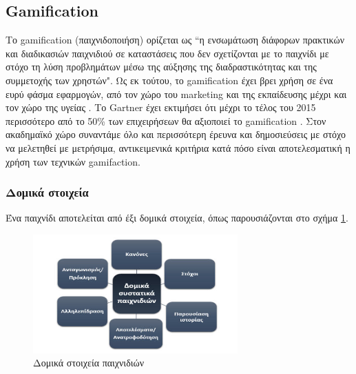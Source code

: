 	\subsection{Gamification}
		Το gamification (παιχνιδοποιήση) ορίζεται ως ``η ενσωμάτωση διάφορων πρακτικών και διαδικασιών παιχνιδιού σε καταστάσεις που δεν σχετίζονται με το παιχνίδι με στόχο τη λύση προβλημάτων μέσω της αύξησης της διαδραστικότητας και της συμμετοχής των χρηστών"\cite{Deterding:2011:GDE:2181037.2181040}\cite{Rojas:2013:MPG:2583008.2583033}. Ως εκ τούτου, το gamification έχει βρει χρήση σε ένα ευρύ φάσμα εφαρμογών, από τον χώρο του marketing και της εκπαίδευσης μέχρι και τον χώρο της υγείας \cite{6758978}. Το Gartner έχει εκτιμήσει ότι μέχρι το τέλος του 2015 περισσότερο από το 50\% των επιχειρήσεων θα αξιοποιεί το gamification \cite{gartnerGamification}. Στον ακαδημαϊκό χώρο συναντάμε όλο και περισσότερη έρευνα και δημοσιεύσεις με στόχο να μελετηθεί με μετρήσιμα, αντικειμενικά κριτήρια κατά πόσο είναι αποτελεσματική η χρήση των τεχνικών gamifaction. 

	\subsubsection{Δομικά στοιχεία}
	Ένα παιχνίδι αποτελείται από έξι δομικά στοιχεία, όπως παρουσιάζονται στο σχήμα \ref{fig:gamification_components}.
		
		\begin{figure}[h]
		    \centering
		    \includegraphics[width=0.7\textwidth]{gamification_components.jpg}
		    \caption{Δομικά στοιχεία παιχνιδιών}
		    \label{fig:gamification_components}
		\end{figure}
	
